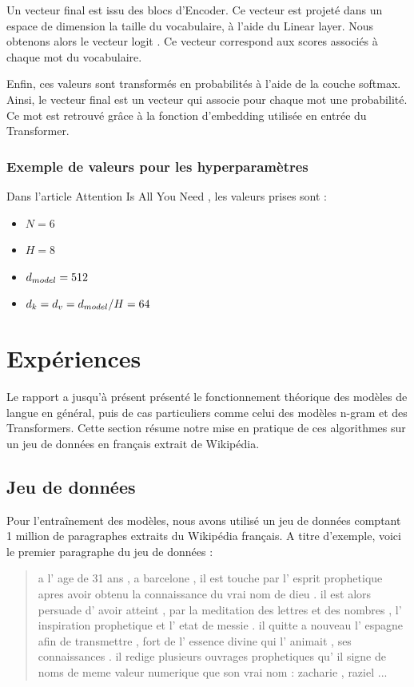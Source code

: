 Un vecteur final est issu des blocs d'Encoder. Ce vecteur est projeté dans un espace de dimension la taille du vocabulaire,
à l'aide du Linear layer. Nous obtenons alors le vecteur \og logit \fg{}. Ce vecteur correspond aux scores associés
à chaque mot du vocabulaire.

Enfin, ces valeurs sont transformés en probabilités à l'aide de la couche softmax. Ainsi, le vecteur final est un
vecteur qui associe pour chaque mot une probabilité. Ce mot est retrouvé grâce à la fonction d'embedding
utilisée en entrée du Transformer.


\subsubsection{Exemple de valeurs pour les hyperparamètres}

Dans l'article \og Attention Is All You Need \fg{} \cite{vaswani2017attention}, les valeurs prises sont :

\begin{itemize}
  \item $N=6$
  \item $H=8$
  \item $d_{model} = 512$
  \item $d_k = d_v = d_{model}/H = 64$
\end{itemize}


\hypertarget{expuxe9riences}{%
\section{Expériences}\label{expuxe9riences}}

Le rapport a jusqu'à présent présenté le fonctionnement théorique des
modèles de langue en général, puis de cas particuliers comme celui des
modèles n-gram et des Transformers. Cette section résume notre mise en
pratique de ces algorithmes sur un jeu de données en français extrait de
Wikipédia.

\hypertarget{jeu-de-donnuxe9es}{%
\subsection{Jeu de données}\label{jeu-de-donnuxe9es}}

Pour l'entraînement des modèles, nous avons utilisé un jeu de données
comptant 1 million de paragraphes extraits du Wikipédia français. A
titre d'exemple, voici le premier paragraphe du jeu de données :

\begin{quotation}
a l' age de 31 ans , a barcelone , il est touche par l' esprit prophetique apres avoir obtenu la connaissance du vrai nom de dieu . il est alors persuade d' avoir atteint , par la meditation des lettres et des nombres , l' inspiration prophetique et l' etat de messie . il quitte a nouveau l' espagne afin de transmettre , fort de l' essence divine qui l' animait , ses connaissances . il redige plusieurs ouvrages prophetiques qu' il signe de noms de meme valeur numerique que son vrai nom : zacharie , raziel ...
\end{quotation}

